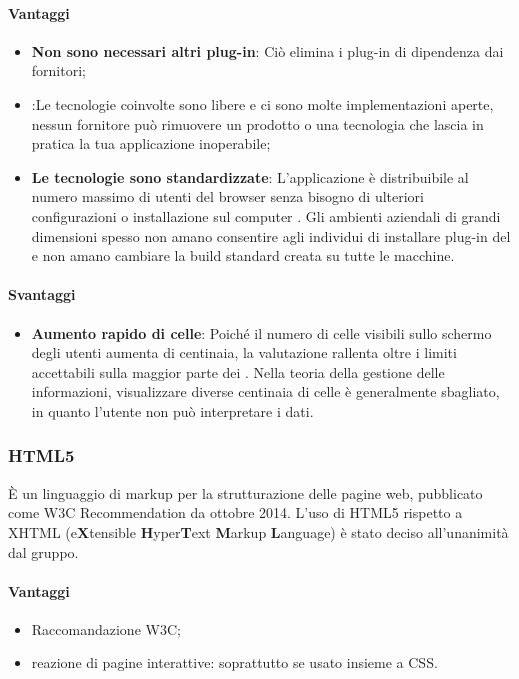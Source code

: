 \paragraph{Vantaggi}
\begin{itemize}
\item \textbf{Non sono necessari altri plug-in}: Ciò elimina i plug-in di dipendenza dai fornitori;
\item \textbf{}:Le tecnologie coinvolte sono libere e ci sono molte implementazioni aperte, nessun fornitore può rimuovere un prodotto o una tecnologia che lascia in pratica la tua applicazione inoperabile;
\item \textbf{Le tecnologie sono standardizzate}: L'applicazione è distribuibile al numero massimo di utenti del browser senza bisogno di ulteriori configurazioni o installazione sul computer . Gli ambienti aziendali di grandi dimensioni spesso non amano consentire agli individui di installare plug-in del  e non amano cambiare la build standard creata su tutte le macchine.
\end{itemize}

\paragraph{Svantaggi}
\begin{itemize}
\item \textbf{Aumento rapido di celle}: Poiché il numero di celle visibili sullo schermo degli utenti aumenta di centinaia, la valutazione rallenta oltre i limiti accettabili sulla maggior parte dei . Nella teoria della gestione delle informazioni, visualizzare diverse centinaia di celle è generalmente sbagliato, in quanto l'utente non può interpretare i dati. 
\end{itemize}

\subsubsection{HTML5}
È un linguaggio di markup per la strutturazione delle pagine web, pubblicato come W3C Recommendation da ottobre 2014. L’uso di HTML5 rispetto a XHTML
(e\textbf{X}tensible \textbf{H}yper\textbf{T}ext \textbf{M}arkup \textbf{L}anguage) è stato deciso all'unanimità dal gruppo.

\paragraph{Vantaggi}
\begin{itemize}
\item Raccomandazione W3C;
\item reazione di pagine interattive: soprattutto se usato insieme a CSS.
\end{itemize}

